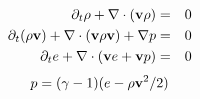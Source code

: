 \begin{eqnarray*}
    \partial_t \rho+\nabla\cdot({\bf v}\rho)&=&0
\\
    \partial_t(\rho{\bf v})+\nabla\cdot({\bf v}\rho{\bf v})+\nabla p&=&0
\\
    \partial_t e+\nabla\cdot({\bf v} e+{\bf v} p)&=&0
\end{eqnarray*}
\null
\begin{displaymath}
   p=(\gamma-1)(e-\rho{\bf v}^2/2)
\end{displaymath}
